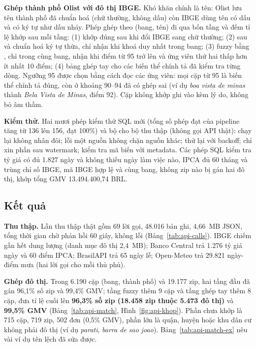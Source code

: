 \textbf{Ghép thành phố Olist với đô thị IBGE.} Khó khăn chính là tên: Olist lưu tên thành phố đã chuẩn hoá (chữ thường, không dấu) còn IBGE dùng tên có dấu và có ký tự như dấu nháy. Phép ghép theo (bang, tên) đi qua bốn tầng và đếm tỉ lệ khớp sau mỗi tầng: (1) khớp đúng sau khi đổi IBGE sang chữ thường; (2) sau  và chuẩn hoá ký tự thừa, chỉ nhận khi khoá duy nhất trong bang; (3) fuzzy bằng , chỉ trong cùng bang, nhận khi điểm từ 95 trở lên và ứng viên thứ hai thấp hơn ít nhất 10 điểm; (4) bảng ghép tay  cho các biến thể chính tả đã kiểm tra từng dòng. Ngưỡng 95 được chọn bằng cách đọc các ứng viên: mọi cặp từ 95 là biến thể chính tả đúng, còn ở khoảng 90--94 đã có ghép sai (ví dụ \emph{boa vista de minas} thành \emph{Bela Vista de Minas}, điểm 92). Cặp không khớp ghi vào  kèm lý do, không bỏ âm thầm.

\textbf{Kiểm thử.} Hai mươi phép kiểm thử SQL mới (tổng số phép đạt của pipeline tăng từ 136 lên 156, đạt 100\%) và bộ  cho bộ thu thập (không gọi API thật): chạy lại không nhân đôi; lỗi một nguồn không chặn nguồn khác; thử lại với backoff; chỉ xin phần sau watermark; kiểm tra mã biến với metadata. Các phép SQL kiểm tra tỷ giá có đủ 1.827 ngày và không thiếu ngày làm việc nào, IPCA đủ 60 tháng và trùng chỉ số IBGE, mã IBGE hợp lệ và cùng bang, không zip nào bị gán hai đô thị,  khớp tổng GMV 13.494.400,74 BRL.

\subsection{Kết quả}\label{sec:api-ket-qua}
\textbf{Thu thập.} Lần thu thập thật gồm 69 lời gọi, 48.016 bản ghi, 4,66~MB JSON, tổng thời gian chờ phản hồi 60 giây, không lỗi (Bảng~\ref{tab:api-calls}). IBGE chiếm gần hết dung lượng (danh mục đô thị 2,4~MB); Banco Central trả 1.276 tỷ giá ngày và 60 điểm IPCA; BrasilAPI trả 65 ngày lễ; Open-Meteo trả 29.821 ngày-điểm mưa (hai lời gọi cho mỗi thủ phủ).


\textbf{Ghép đô thị.} Trong 6.190 cặp (bang, thành phố) và 19.177 zip, hai tầng đầu đã gán 96,1\% số zip và 99,4\% GMV; tầng fuzzy thêm 9 cặp và tầng ghép tay thêm 8 cặp, đưa tỉ lệ cuối lên \textbf{96,3\% số zip (18.458 zip thuộc 5.473 đô thị)} và \textbf{99,5\% GMV} (Bảng~\ref{tab:api-match}, Hình~\ref{fig:api-khop}). Phần chưa khớp là 715 cặp, 719 zip, 502 đơn (0,5\% GMV), phần lớn là quận, huyện hoặc khu dân cư không phải đô thị (ví dụ \emph{parati}, \emph{barra de sao joao}). Bảng~\ref{tab:api-match-ex} nêu vài ví dụ tên lệch đã sửa được.



